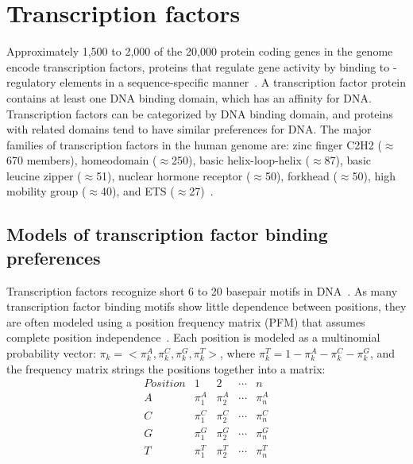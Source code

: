 \section{Transcription factors}
%
Approximately 1,500 to 2,000 of the 20,000 protein coding genes in the genome encode transcription factors,
proteins that regulate gene activity by binding to \cis-regulatory elements in a sequence-specific
manner~\citep{Fulton2009,Vaquerizas2009}.  A transcription factor protein contains at least one DNA binding
domain, which has an affinity for DNA.  Transcription factors can be categorized by DNA binding domain, and
proteins with related domains tend to have similar preferences for DNA.  The major families of transcription
factors in the human genome are: zinc finger C2H2 ($\approx$670 members), homeodomain ($\approx$250), basic helix-loop-helix ($\approx$87),
basic leucine zipper ($\approx$51), nuclear hormone receptor ($\approx$50), forkhead ($\approx$50), high mobility group ($\approx$40), and
ETS ($\approx$27)~\citep{Jolma2010}.
%

\subsection{Models of transcription factor binding preferences}
Transcription factors recognize short 6 to 20 basepair motifs in DNA~\citep{Matys2006}.  As many transcription factor binding
motifs show little dependence between positions, they are often modeled using a position frequency matrix (PFM)
that assumes complete position independence~\citep{Stormo2000}.  Each position is modeled as a multinomial probability vector:
\begin{math} \pi_k = < \pi^A_k, \pi^C_k, \pi^G_k, \pi^T_k > \end{math}, where
\begin{math} \pi^T_k = 1 - \pi^A_k - \pi^C_k - \pi^G_k \end{math}, and the frequency matrix strings
the positions together into a matrix:
\[ \begin{array}{r|cccc}
Position & 1 & 2 & \cdots & n \\
\hline
    A & \pi^A_1 & \pi^A_2 & \cdots & \pi^A_n \\
    C & \pi^C_1 & \pi^C_2 & \cdots & \pi^C_n \\
    G & \pi^G_1 & \pi^G_2 & \cdots & \pi^G_n \\
    T & \pi^T_1 & \pi^T_2 & \cdots & \pi^T_n \\
\end{array} \]

